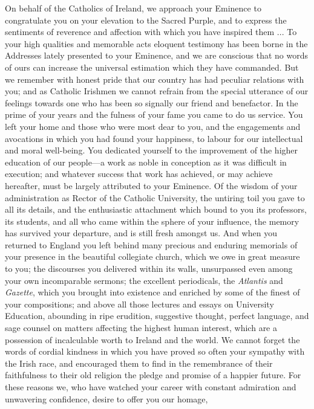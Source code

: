 On behalf of the Catholics of Ireland, we approach your Eminence to
congratulate you on your elevation to the Sacred Purple, and to
express the sentiments of reverence and affection with which you have
inspired them ... To your high qualities and memorable acts eloquent
testimony has been borne in the Addresses lately presented to your
Eminence, and we are conscious that no words of ours can increase the
universal estimation which they have commanded. But we remember with
honest pride that our country has had peculiar relations with you; and
as Catholic Irishmen we cannot refrain from the special utterance of
our feelings towards one who has been so signally our friend and
benefactor. In the prime of your years and the fulness of your fame
you came to do us service. You left your home and those who were most
dear to you, and the engagements and avocations in which you had found
your happiness, to labour for our intellectual and moral well-being.
You dedicated yourself to the improvement of the higher education of
our people—a work as noble in conception as it was difficult in
execution; and whatever success that work has achieved, or may achieve
hereafter, must be largely attributed to your Eminence. Of the wisdom
of your administration as Rector of the Catholic University, the
untiring toil you gave to all its details, and the enthusiastic
attachment which bound to you its professors, its students, and all
who came within the sphere of your influence, the memory has survived
your departure, and is still fresh amongst us. And when you returned
to England you left behind many precious and enduring memorials of
your presence in the beautiful collegiate church, which we owe in
great measure to you; the discourses you delivered within its walls,
unsurpassed even among your own incomparable sermons; the excellent
periodicals, the \emph{Atlantis} and \emph{Gazette}, which you brought
into existence and enriched by some of the finest of your
compositions; and above all those lectures and essays on University
Education, abounding in ripe erudition, suggestive thought,
perfect language, and sage counsel on matters affecting the highest
human interest, which are a possession of incalculable worth to
Ireland and the world. We cannot forget the words of cordial kindness
in which you have proved so often your sympathy with the Irish race,
and encouraged them to find in the remembrance of their faithfulness
to their old religion the pledge and promise of a happier future. For
these reasons we, who have watched your career with constant
admiration and unwavering confidence, desire to offer you our homage,
